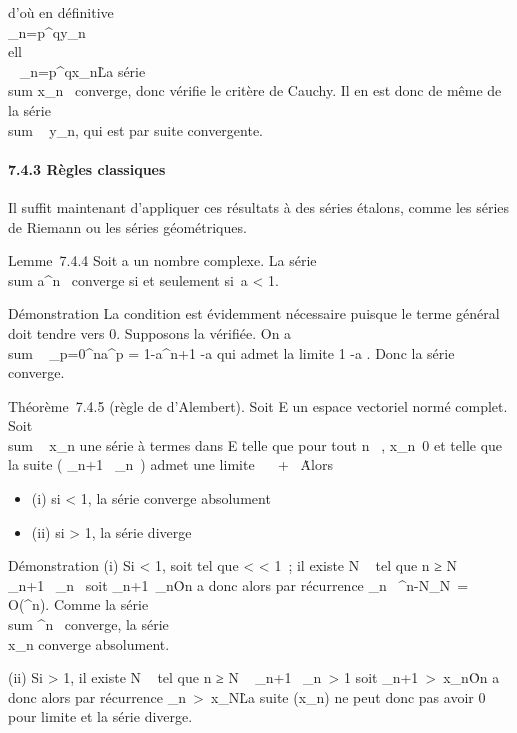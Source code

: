 \documentclass[]{article}
\begin{document}
d'où en définitive \\\sum
 _n=p^qy_n  \over
\\ell\
\\
\sum ~
_n=p^qx_n\. La série
\\sum  x_n~
converge, donc vérifie le critère de Cauchy. Il en est donc de même de
la série \\sum ~
y_n, qui est par suite convergente.

\paragraph{7.4.3 Règles classiques}

Il suffit maintenant d'appliquer ces résultats à des séries étalons,
comme les séries de Riemann ou les séries géométriques.

Lemme~7.4.4 Soit a un nombre complexe. La série
\\sum  a^n~
converge si et seulement si~a < 1.

Démonstration La condition est évidemment nécessaire puisque le terme
général doit tendre vers 0. Supposons la vérifiée. On a
\\sum ~
_p=0^na^p = 1-a^n+1
-a qui admet la limite  1 \over
1-a . Donc la série converge.

Théorème~7.4.5 (règle de d'Alembert). Soit E un espace vectoriel normé
complet. Soit \\sum ~
x_n une série à termes dans E telle que pour tout n \in {}~,
x_n\neq~0 et telle que la suite (
\x_n+1\
\over
\x_n\ )
admet une limite \ell \in {}~ \cup\ + \infty~\. Alors

\begin{itemize}
\itemsep1pt\parskip0pt
\item
  (i) si \ell < 1, la série converge absolument
\item
  (ii) si \ell > 1, la série diverge
\end{itemize}

Démonstration (i) Si \ell < 1, soit \rho tel que \ell < \rho
< 1~; il existe N \in {}~ tel que n ≥ N \rigtharrow~
\x_n+1\
\over
\x_n\ \leq \rho
soit \x_n+1\
\leq \rho\x_n\. On
a donc alors par récurrence
\x_n\ \leq
\rho^n-N\x_N\
= O(\rho^n). Comme la série
\\sum  \rho^n~
converge, la série \\\sum
 x_n converge absolument.

(ii) Si \ell > 1, il existe N \in {}~ tel que n ≥ N \rigtharrow~
\x_n+1\
\over
\x_n\
> 1 soit
\x_n+1\
>\
x_n\. On a donc alors par récurrence
\x_n\
>\
x_N\. La suite (x_n) ne peut
donc pas avoir 0 pour limite et la série diverge.
\end{document}
